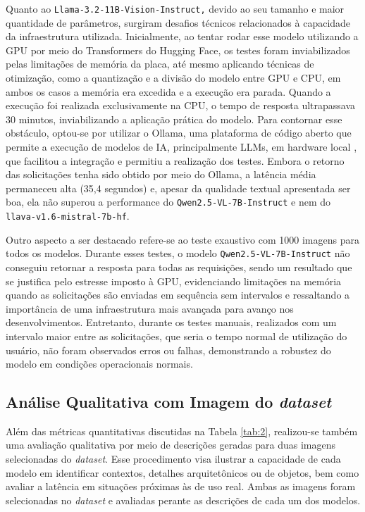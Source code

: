 Quanto ao \texttt{Llama-3.2-11B-Vision-Instruct,} devido ao seu tamanho e maior quantidade de parâmetros, surgiram desafios técnicos relacionados à capacidade da infraestrutura utilizada. Inicialmente, ao tentar rodar esse modelo utilizando a GPU por meio do Transformers do Hugging Face, os testes foram inviabilizados pelas limitações de memória da placa, até mesmo aplicando técnicas de otimização, como a quantização e a divisão do modelo entre GPU e CPU, em ambos os casos a memória era excedida e a execução era parada. Quando a execução foi realizada exclusivamente na CPU, o tempo de resposta ultrapassava 30 minutos, inviabilizando a aplicação prática do modelo. Para contornar esse obstáculo, optou-se por utilizar o Ollama, uma plataforma de código aberto que permite a execução de modelos de IA, principalmente LLMs, em hardware local \cite{bem2024}, que facilitou a integração e permitiu a realização dos testes. Embora o retorno das solicitações tenha sido obtido por meio do Ollama, a latência média permaneceu alta (35,4 segundos) e, apesar da qualidade textual apresentada ser boa, ela não superou a performance do \texttt{Qwen2.5-VL-7B-Instruct} e nem do \texttt{llava-v1.6-mistral-7b-hf}.

Outro aspecto a ser destacado refere-se ao teste exaustivo com 1000 imagens para todos os modelos. Durante esses testes, o modelo \texttt{Qwen2.5-VL-7B-Instruct} não conseguiu retornar a resposta para todas as requisições, sendo um resultado que se justifica pelo estresse imposto à GPU, evidenciando limitações na memória quando as solicitações são enviadas em sequência sem intervalos e ressaltando a importância de uma infraestrutura mais avançada para avanço nos desenvolvimentos. Entretanto, durante os testes manuais, realizados com um intervalo maior entre as solicitações, que seria o tempo normal de utilização do usuário, não foram observados erros ou falhas, demonstrando a robustez do modelo em condições operacionais normais.

\subsection{Análise Qualitativa com Imagem do \textit{dataset}}

Além das métricas quantitativas discutidas na Tabela \ref{tab:2}, realizou-se também uma avaliação qualitativa por meio de descrições geradas para duas imagens selecionadas do \textit{dataset}. Esse procedimento visa ilustrar a capacidade de cada modelo em identificar contextos, detalhes arquitetônicos ou de objetos, bem como avaliar a latência em situações próximas às de uso real. Ambas as imagens foram selecionadas no \textit{dataset} e avaliadas perante as descrições de cada um dos modelos.

